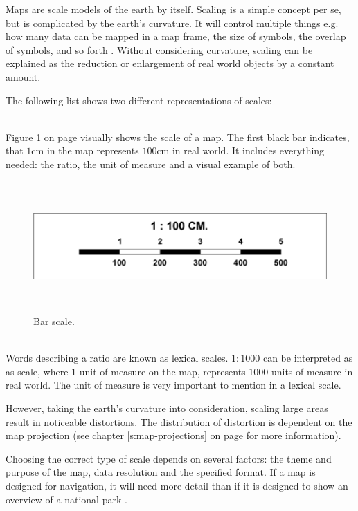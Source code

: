 Maps are scale models of the earth by itself. Scaling is a simple concept per se, but is complicated by the earth's curvature. It will control multiple things e.g. how many data can be mapped in a map frame, the size of symbols, the overlap of symbols, and so forth . Without considering curvature, scaling can be explained as the reduction or enlargement of real world objects by a constant amount.

The following list shows two different representations of scales:
\begin{enumerate}
 \hfill \\
Figure \ref{fig:bar-scale} on page \pageref{fig:bar-scale} visually shows the scale of a map. The first black bar indicates, that $1$cm in the map represents $100$cm in real world. It includes everything needed: the ratio, the unit of measure and a visual example of both.

\begin{figure}[!htb]
\centering
\includegraphics[height=5cm,keepaspectratio]{images/methods/scalebar.png}
\caption[
    Bar scale.
]{Bar scale.}
\label{fig:bar-scale}
\end{figure}

 \hfill \\
Words describing a ratio are known as lexical scales. $1:1000$ can be interpreted as as scale, where $1$ unit of measure on the map, represents $1000$ units of measure in real world. The unit of measure is very important to mention in a lexical scale.
\end{enumerate}

However, taking the earth's curvature into consideration, scaling large areas result in noticeable distortions. The distribution of distortion is dependent on the map projection (see chapter \ref{s:map-projections} on page \pageref{s:map-projections} for more information).

Choosing the correct type of scale depends on several factors: the theme and purpose of the map, data resolution and the specified format. If a map is designed for navigation, it will need more detail than if it is designed to show an overview of a national park .
